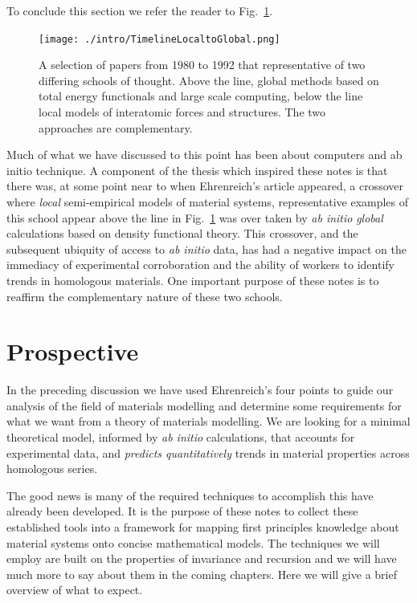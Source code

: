 To conclude this section we refer the reader to Fig.~\ref{fig:loctoglob}.
%
\begin{figure}
\texttt{[image: ./intro/TimelineLocaltoGlobal.png]}
\caption{A selection of papers from 1980 to 1992 that representative of two differing schools of thought. 
Above the line, global methods based on total energy functionals and large scale computing, below the 
        line local models of interatomic forces and structures. The two approaches are complementary.
        \label{fig:loctoglob}}
\end{figure}
%
Much of what we have discussed to this point has been about computers and ab initio technique.
A component of the thesis which inspired these notes is 
that there was, at some point near to when Ehrenreich's article appeared, 
a crossover where \textit{local} semi-empirical
models of material systems, representative examples of this school appear 
above the line in Fig.~\ref{fig:loctoglob} was over taken by {\it ab initio} 
\textit{global} calculations based on density functional theory. 
This crossover, and the subsequent ubiquity of access to {\it ab initio} data, 
has had a negative impact on the immediacy of experimental corroboration 
and the ability of workers to identify trends in homologous materials.
One important purpose of these notes is to reaffirm the complementary nature of these
two schools.

\section{Prospective}
In the preceding discussion we have used 
Ehrenreich's four points to guide our analysis of the field of materials modelling
and determine some requirements for what we want from a theory of materials modelling.
We are looking for a minimal theoretical model, 
informed by {\it ab initio} calculations, that accounts for 
experimental data, and {\it predicts quantitatively} trends in material properties
across homologous series. 

The good news is many of the required techniques to accomplish this have
already been developed. It is the purpose of these notes to collect 
these established tools into 
a framework for mapping first principles knowledge about material systems 
onto concise mathematical models. The techniques we will employ are built
on the properties of invariance and recursion and we will have much more to 
say about them in the coming chapters. Here we will give a brief overview
of what to expect.

